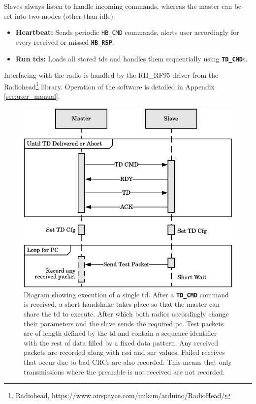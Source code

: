 \vspace{-0mm}
Slaves always listen to handle incoming commands, whereas the master can be set into two modes (other than idle):
\begin{itemize}
	\item \textbf{Heartbeat:} Sends periodic \texttt{HB\_CMD} commands, alerts user accordingly for every received or missed \textbf{\texttt{HB\_RSP}}.
	\item {\textbf{Run \ac{td}s:} Loads all stored \ac{td}s and handles them sequentially using \textbf{\texttt{TD\_CMD}}s.}
\end{itemize}

Interfacing with the radio is handled by the RH\_RF95 driver from the Radiohead\footnote{Radiohead, https://www.airspayce.com/mikem/arduino/RadioHead/} library. Operation of the software is detailed in Appendix \ref{sec:user_manual}.
\vspace{10mm}
\begin{figure}[H]
    \centering
    \includegraphics{Figures/software_testdef_execution.pdf}
    \caption[Master-Slave test definition execution method]{
    	Diagram showing execution of a single \ac{td}. After a \textbf{\texttt{TD\_CMD}} command is received, a short handshake takes place so that the master can share the \ac{td} to execute. After which both radios accordingly change their parameters and the slave sends the required \ac{pc}. Test packets are of length defined by the \ac{td} and contain a sequence identifier with the rest of data filled by a fixed data pattern. Any received packets are recorded along with \ac{rssi} and \ac{snr} values. Failed receives that occur due to bad CRCs are also recorded. This means that only transmissions where the preamble is not received are not recorded.
    }
    \label{fig:software_testdef_execution}
\end{figure}